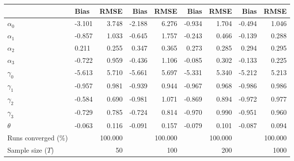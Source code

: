 
\begin{tabular}[t]{llrrrrrrr}
\toprule
  & Bias & RMSE & Bias & RMSE & Bias & RMSE & Bias & RMSE\\
\midrule
$\alpha_{0}$ & -3.101 & 3.748 & -2.188 & 6.276 & -0.934 & 1.704 & -0.494 & 1.046\\
$\alpha_{1}$ & -0.857 & 1.033 & -0.645 & 1.757 & -0.243 & 0.466 & -0.139 & 0.288\\
$\alpha_{2}$ & 0.211 & 0.255 & 0.347 & 0.365 & 0.273 & 0.285 & 0.294 & 0.295\\
$\alpha_{3}$ & -0.722 & 0.959 & -0.436 & 1.106 & -0.085 & 0.302 & -0.133 & 0.225\\
$\gamma_{0}$ & -5.613 & 5.710 & -5.661 & 5.697 & -5.331 & 5.340 & -5.212 & 5.213\\
$\gamma_{1}$ & -0.957 & 0.981 & -0.939 & 0.944 & -0.967 & 0.968 & -0.986 & 0.986\\
$\gamma_{2}$ & -0.584 & 0.690 & -0.981 & 1.071 & -0.869 & 0.894 & -0.972 & 0.977\\
$\gamma_{3}$ & -0.729 & 0.785 & -0.724 & 0.814 & -0.970 & 0.990 & -0.951 & 0.960\\
$\theta$ & -0.063 & 0.116 & -0.091 & 0.157 & -0.079 & 0.101 & -0.087 & 0.094\\
Runs converged (\%) &  & 100.000 &  & 100.000 &  & 100.000 &  & 100.000\\
Sample size ($T$) &  & 50 &  & 100 &  & 200 &  & 1000\\
\bottomrule
\end{tabular}
